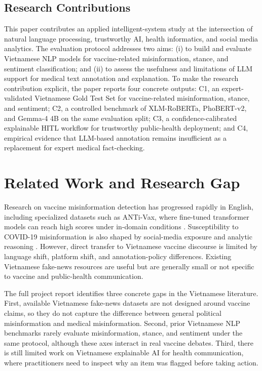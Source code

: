 \documentclass[runningheads]{llncs}
\begin{document}
\subsection{Research Contributions}
This paper contributes an applied intelligent-system study at the intersection of natural language processing, trustworthy AI, health informatics, and social media analytics. The evaluation protocol addresses two aims: (i) to build and evaluate Vietnamese NLP models for vaccine-related misinformation, stance, and sentiment classification; and (ii) to assess the usefulness and limitations of LLM support for medical text annotation and explanation. To make the research contribution explicit, the paper reports four concrete outputs: C1, an expert-validated Vietnamese Gold Test Set for vaccine-related misinformation, stance, and sentiment; C2, a controlled benchmark of XLM-RoBERTa, PhoBERT-v2, and Gemma-4 4B on the same evaluation split; C3, a confidence-calibrated explainable HITL workflow for trustworthy public-health deployment; and C4, empirical evidence that LLM-based annotation remains insufficient as a replacement for expert medical fact-checking.

\section{Related Work and Research Gap}
Research on vaccine misinformation detection has progressed rapidly in English, including specialized datasets such as ANTi-Vax, where fine-tuned transformer models can reach high scores under in-domain conditions \cite{hayawi2022antivax}. Susceptibility to COVID-19 misinformation is also shaped by social-media exposure and analytic reasoning \cite{roozenbeek2020susceptibility}. However, direct transfer to Vietnamese vaccine discourse is limited by language shift, platform shift, and annotation-policy differences. Existing Vietnamese fake-news resources are useful but are generally small or not specific to vaccine and public-health communication.

The full project report identifies three concrete gaps in the Vietnamese literature. First, available Vietnamese fake-news datasets are not designed around vaccine claims, so they do not capture the difference between general political misinformation and medical misinformation. Second, prior Vietnamese NLP benchmarks rarely evaluate misinformation, stance, and sentiment under the same protocol, although these axes interact in real vaccine debates. Third, there is still limited work on Vietnamese explainable AI for health communication, where practitioners need to inspect why an item was flagged before taking action.
\end{document}
